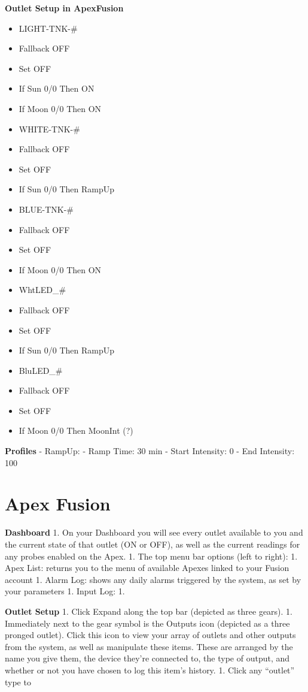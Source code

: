 \documentclass[]{book}
\providecommand{\tightlist}{%
  \setlength{\itemsep}{0pt}\setlength{\parskip}{0pt}}
\begin{document}
 \textbf{Outlet Setup in ApexFusion}

\begin{itemize}
\tightlist
\item
  LIGHT-TNK-\#
\item
  Fallback OFF
\item
  Set OFF
\item
  If Sun 0/0 Then ON
\item
  If Moon 0/0 Then ON
\item
  WHITE-TNK-\#
\item
  Fallback OFF
\item
  Set OFF
\item
  If Sun 0/0 Then RampUp
\item
  BLUE-TNK-\#
\item
  Fallback OFF
\item
  Set OFF
\item
  If Moon 0/0 Then ON
\item
  WhtLED\_\#
\item
  Fallback OFF
\item
  Set OFF
\item
  If Sun 0/0 Then RampUp
\item
  BluLED\_\#
\item
  Fallback OFF
\item
  Set OFF
\item
  If Moon 0/0 Then MoonInt (?)
\end{itemize}

 \textbf{Profiles} - RampUp: - Ramp Time: 30 min - Start Intensity: 0 -
End Intensity: 100

\chapter{Apex Fusion}\label{apex-fusion}

\textbf{Dashboard} 1. On your Dashboard you will see every outlet
available to you and the current state of that outlet (ON or OFF), as
well as the current readings for any probes enabled on the Apex. 1. The
top menu bar options (left to right): 1. Apex List: returns you to the
menu of available Apexes linked to your Fusion account 1. Alarm Log:
shows any daily alarms triggered by the system, as set by your
parameters 1. Input Log: 1.

\textbf{Outlet Setup} 1. Click Expand along the top bar (depicted as
three gears). 1. Immediately next to the gear symbol is the Outputs icon
(depicted as a three pronged outlet). Click this icon to view your array
of outlets and other outputs from the system, as well as manipulate
these items. These are arranged by the name you give them, the device
they're connected to, the type of output, and whether or not you have
chosen to log this item's history. 1. Click any ``outlet'' type to


\end{document}
